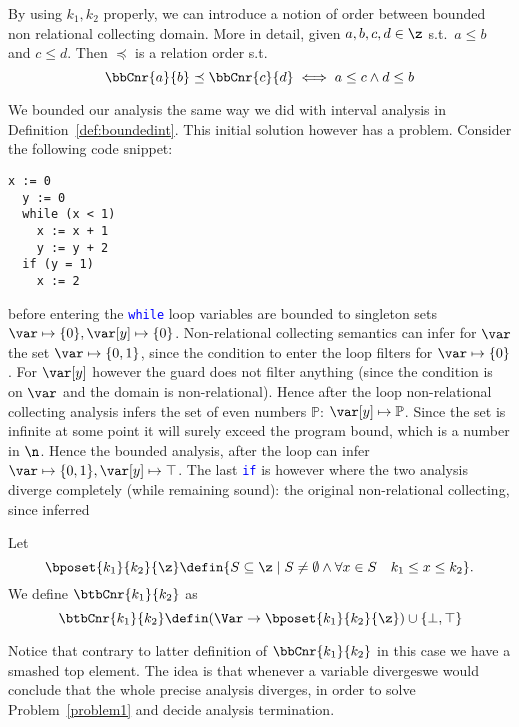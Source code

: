 By using \(k_1, k_2\) properly, we can introduce a notion of order
between bounded non relational collecting domain. More in detail,
given \(a,b,c,d \in \z\) s.t.\ \(a\leq b\) and \(c \leq d\). Then
\(\preceq\) is a relation order s.t.
\begin{equation*}
  \bbCnr{a}{b} \preceq \bbCnr{c}{d} \iff a \leq c \land d \leq b
\end{equation*}

We bounded our analysis the same way we did with interval analysis in
Definition~\ref{def:boundedint}. This initial solution however has a
problem. Consider the following code snippet:
\begin{lstlisting}[language=Imp,caption=Snippet where bounded analysis diverges from the unbounded counterpart, label=code3]
  x := 0
  y := 0
  while (x < 1)
    x := x + 1
    y := y + 2
  if (y = 1)
    x := 2
\end{lstlisting}
before entering the \textcolor{blue}{\texttt{while}} loop variables
are bounded to singleton sets
\(\var \mapsto \{0\}, \var[y] \mapsto \{0\}\). Non-relational
collecting semantics can infer for \(\var\) the set
\(\var\mapsto \{0,1\}\), since the condition to enter the loop filters
for \(\var \mapsto \{0\}\). For \(\var[y]\) however the guard does not
filter anything (since the condition is on \(\var\) and the domain is
non-relational). Hence after the loop non-relational collecting
analysis infers the set of even numbers \(\mathbb{P}\):
\(\var[y] \mapsto \mathbb{P}\). Since the set is infinite at some
point it will surely exceed the program bound, which is a number in
\(\n\). Hence the bounded analysis, after the loop can infer
\(\var\mapsto\{0,1\}, \var[y] \mapsto \top\). The last
\textcolor{blue}{\texttt{if}} is however where the two analysis
diverge completely (while remaining sound): the original
non-relational collecting, since inferred

\begin{definition}
  Let
  \begin{equation*}
    \bposet{k_1}{k_2}{\z} \defin \{S \subseteq \z \mid S \neq \emptyset \land \forall x \in S \quad k_1 \leq x \leq k_2\}.
  \end{equation*}
  We define \(\btbCnr{k_1}{k_2}\) as
  \begin{equation*}
    \btbCnr{k_1}{k_2} \defin (\Var \to \bposet{k_1}{k_2}{\z}) \cup \{\bot, \top\}
  \end{equation*}
\end{definition}
Notice that contrary to latter definition of \(\bbCnr{k_1}{k_2}\) in
this case we have a smashed top element. The idea is that whenever a
variable divergeswe would conclude that the whole precise analysis
diverges, in order to solve Problem~\ref{problem1} and decide analysis
termination.

